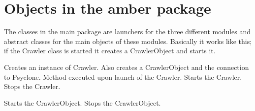 \section{Objects in the amber package}

The classes in the main package are launchers for the three different modules
and abstract classes for the main objects of these modules. Basically it works
like this; if the Crawler class is started it creates a CrawlerObject and
starts it.



\begin{classmetadata}
\end{classmetadata}

\begin{interface}
    {Creates an instance of Crawler. Also creates a CrawlerObject and the
      connection to Psyclone.}
    {Method executed upon launch of the Crawler.}
    {Starts the Crawler.}
    {Stops the Crawler.}
\end{interface}




\begin{classmetadata}
\end{classmetadata}

\begin{interface}
    {Starts the CrawlerObject.}
    {Stops the CrawlerObject.}
\end{interface}




\begin{classmetadata}
\end{classmetadata}

\begin{interface}
\end{interface}




